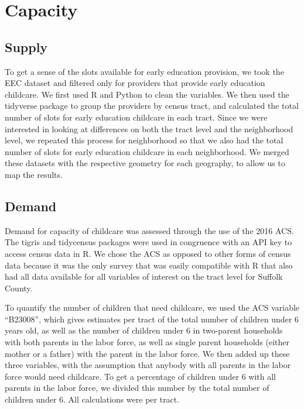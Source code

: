 \documentclass[man]{apa6}
\begin{document}
\section{Capacity}\label{capacity}

\subsection{Supply}\label{supply}

To get a sense of the slots available for early education provision, we
took the EEC dataset and filtered only for providers that provide early
education childcare. We first used R and Python to clean the variables.
We then used the tidyverse package to group the providers by census
tract, and calculated the total number of slots for early education
childcare in each tract. Since we were interested in looking at
differences on both the tract level and the neighborhood level, we
repeated this process for neighborhood so that we also had the total
number of slots for early education childcare in each neighborhood. We
merged these datasets with the respective geometry for each geography,
to allow us to map the results.

\subsection{Demand}\label{demand}

Demand for capacity of childcare was assessed through the use of the
2016 ACS. The tigris and tidycensus packages were used in congruence
with an API key to access census data in R. We chose the ACS as opposed
to other forms of census data because it was the only survey that was
easily compatible with R that also had all data available for all
variables of interest on the tract level for Suffolk County.

To quantify the number of children that need childcare, we used the ACS
variable \enquote{B23008}, which gives estimates per tract of the total
number of children under 6 years old, as well as the number of children
under 6 in two-parent households with both parents in the labor force,
as well as single parent households (either mother or a father) with the
parent in the labor force. We then added up these three variables, with
the assumption that anybody with all parents in the labor force would
need childcare. To get a percentage of children under 6 with all parents
in the labor force, we divided this number by the total number of
children under 6. All calculations were per tract.
\end{document}
